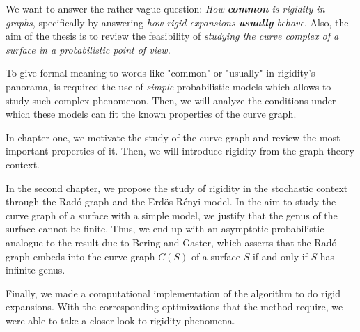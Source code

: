 We want to answer the rather vague question: \textit{How \textbf{common} is rigidity in graphs}, specifically by answering \textit{how rigid expansions \textbf{usually} behave}. Also, the aim of the thesis is to review the feasibility of \textit{studying the curve complex of a surface in a probabilistic point of view.}

To give formal meaning to words like "common" or "usually" in rigidity's panorama, is required the use of \textit{simple} probabilistic models which allows to study such complex phenomenon. Then, we will analyze the conditions under which these models can fit the known properties of the curve graph.

In chapter one, we motivate the study of the curve graph and review the most important properties of it. Then, we will introduce rigidity from the graph theory context.

In the second chapter, we propose the study of rigidity in the stochastic context through the Radó graph and the Erdös-Rényi model. In the aim to study the curve graph of a surface with a simple model, we justify that the genus of the surface cannot be finite. Thus, we end up with an asymptotic probabilistic analogue to the result due to Bering and Gaster, which asserts that the Radó graph embeds into the curve graph $C(S)$ of a surface $S$ if and only if $S$ has infinite genus.

Finally, we made a computational implementation of the algorithm to do rigid expansions. With the corresponding optimizations that the method require, we were able to take a closer look to rigidity phenomena.